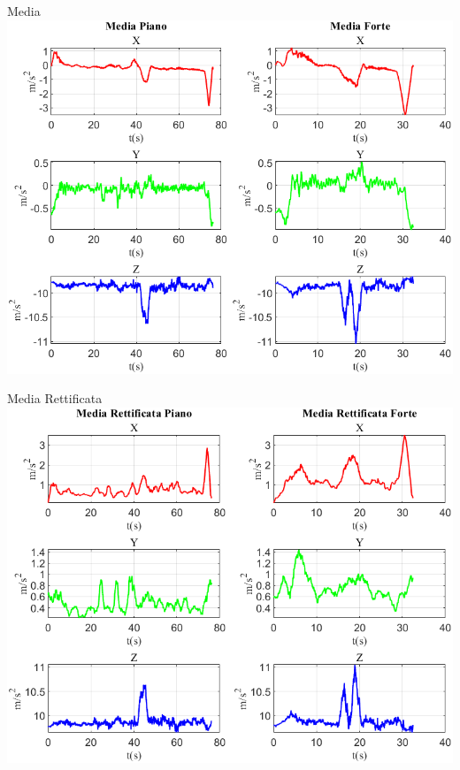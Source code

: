 	\begin{frame}{{Media}}
		\centering\includegraphics[height=.8\textheight]{figure/Acc/Media}
	\end{frame}
	
	\begin{frame}{{Media Rettificata}}
		\centering\includegraphics[height=.8\textheight]{figure/Acc/Media Rettificata}
	\end{frame}
	
